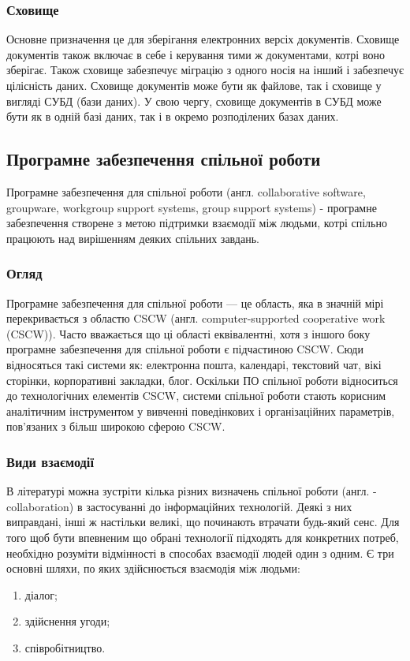 \subsubsection{Сховище}
Основне призначення це для зберігання електронних версіх документів. 
Сховище документів також включає в себе і керування тими ж документами, котрі воно зберігає.
Також сховище забезпечує міграцію з одного носія на інший і забезпечує цілісність даних.
Сховище документів може бути як файлове, так і сховище у вигляді СУБД (бази даних). 
У свою чергу, сховище документів в СУБД може бути як в одній базі даних, так і в окремо розподілених базах даних.
        

\subsection{Програмне забезпечення спільної роботи}
Програмне забезпечення для спільної роботи (англ. collaborative software, groupware, workgroup support systems, group support systems) - програмне забезпечення створене з метою підтримки взаємодії між людьми, котрі спільно працюють над вирішенням деяких спільних завдань. 

\subsubsection{Огляд}
Програмне забезпечення для спільної роботи --- це область, яка в значній мірі перекривається з областю CSCW (англ. computer-supported cooperative work (CSCW)).
Часто вважається що ці області еквівалентні, хотя з іншого боку програмне забезпечення для спільної роботи є підчастиною CSCW.
Сюди відносяться такі системи як: електронна пошта, календарі, текстовий чат, вікі сторінки, корпоративні закладки, блог.
Оскільки ПО спільної роботи відноситься до технологічних елементів CSCW, системи спільної роботи стають корисним аналітичним інструментом у вивченні поведінкових і організаційних параметрів, пов'язаних з більш широкою сферою CSCW.

\subsubsection{Види взаємодії}
В літературі можна зустріти кілька різних визначень спільної роботи (англ. - collaboration) в застосуванні до інформаційних технологій. Деякі з них виправдані, інші ж настільки великі, що починають втрачати будь-який сенс.
Для того щоб бути впевненим що обрані технології підходять для конкретних потреб, необхідно розуміти відмінності в способах взаємодії людей один з одним.
Є три основні шляхи, по яких здійснюється взаємодія між людьми: 
\begin{enumerate}
\item діалог;
\item здійснення угоди;
\item співробітництво.
\end{enumerate}

